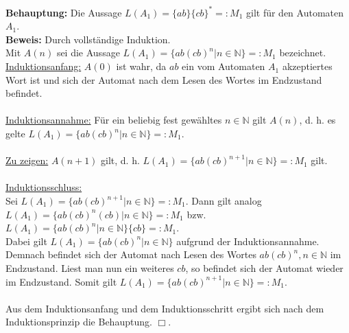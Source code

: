 \documentclass[10pt,a4paper,oneside,ngerman,numbers=noenddot]{scrartcl}
\begin{document}
\section{} %
\textbf{Behauptung:} Die Aussage $L(A_{1}) = \{ab\}\{cb\}^{*} =: M_{1}$ gilt für den Automaten $A_{1}$.\\
\textbf{Beweis:} Durch vollständige Induktion. \\
Mit $A(n)$ sei die Aussage $L(A_{1}) = \{ab(cb)^{n}|n \in \mathbb{N} \} =: M_{1}$ bezeichnet. \\
\underline{Induktionsanfang:} $A(0)$ ist wahr, da $ab$ ein vom Automaten $A_{1}$ akzeptiertes Wort ist und sich der Automat nach dem Lesen des Wortes im Endzustand befindet.\\\\
\underline{Induktionsannahme:} Für ein beliebig fest gewähltes $n \in \mathbb{N}$ gilt $A(n)$, d. h. es gelte $L(A_{1}) = \{ab(cb)^{n}|n \in \mathbb{N} \} =: M_{1}$.\\\\
\underline{Zu zeigen:} $A(n+1)$ gilt, d. h. $L(A_{1}) = \{ab(cb)^{n+1}|n \in \mathbb{N} \} =: M_{1}$ gilt.\\\\
\underline{Induktionsschluss:}\\
Sei $L(A_{1}) = \{ab(cb)^{n+1}|n \in \mathbb{N} \} =: M_{1}$. Dann gilt analog $L(A_{1}) = \{ab(cb)^{n}(cb)|n \in \mathbb{N} \} =: M_{1}$ bzw. $L(A_{1}) = \{ab(cb)^{n}|n \in \mathbb{N} \}\{cb\} =: M_{1}$. \\
Dabei gilt $L(A_{1}) = \{ab(cb)^{n}|n \in \mathbb{N} \}$ aufgrund der Induktionsannahme.\\
Demnach befindet sich der Automat nach Lesen des Wortes $ab(cb)^{n}, n \in \mathbb{N}$ im Endzustand. Liest man nun ein weiteres $cb$, so befindet sich der Automat wieder im Endzustand. Somit gilt $L(A_{1}) = \{ab(cb)^{n+1}|n \in \mathbb{N} \} =: M_{1}$.\\\\
Aus dem Induktionsanfang und dem Induktionsschritt ergibt sich nach dem Induktionsprinzip die Behauptung. \hfill $\Box$.
\end{document}
